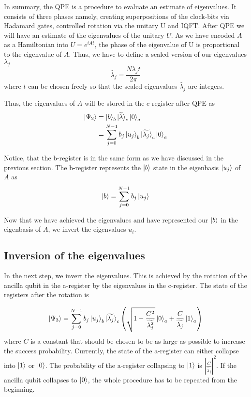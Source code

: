 In summary, the QPE is a procedure to evaluate an estimate of eigenvalues. 
It consists of three phases namely, creating superpositions of the clock-bits via Hadamard gates, controlled rotation via the unitary U and IQFT.
After QPE we will have an estimate of the eigenvalues of the unitary $U$. 
As we have encoded $A$ as a Hamiltonian into $U = e^{iAt}$, the phase of the eigenvalue of U is proportional to the eigenvalue of $A$.
Thus, we have to define a scaled version of our eigenvalues $\lambda_j$
\begin{equation}
\widetilde{\lambda_j} = \frac {N\lambda_jt}{2\pi}
\end{equation}
where $t$ can be chosen freely so that the scaled eigenvalues $\widetilde{\lambda_j}$ are integers.

Thus, the eigenvalues of $A$ will be stored in the c-register after QPE as
\begin{equation}
\begin{split}
\ket{\Psi_2} &= \ket{b}_b \ket{\widetilde{\lambda}}_c\ket{0}_a \\
& =\sum_{j=0}^{N-1} b_j \ket{u_j}_b \ket{\widetilde{\lambda_j}}_c \ket 0_a
\end{split}
\end{equation}

Notice, that the b-register is in the same form as we have discussed in the previous section. 
The b-register represents the $\ket b$ state in the eigenbasis $\ket{u_j}$ of $A$ as
\begin{equation}
\ket{b} = \sum_{j=0}^{N-1} b_j\ket{u_j}
\end{equation}

Now that we have achieved the eigenvalues and have represented our $\ket{b}$ in the eigenbasis of $A$, we invert the eigenvalues $u_i$.


\subsection{Inversion of the eigenvalues}
In the next step, we invert the eigenvalues.
This is achieved by the rotation of the ancilla qubit in the a-register by the eigenvalues in the c-register.
The state of the registers after the rotation is

\begin{equation}
\ket{\Psi_3} = \sum_{j=0}^{N-1} b_j \ket{u_j}_b {\ket{\widetilde{\lambda_j}}}_c \left(\sqrt{1-\frac{C^2}{\widetilde{\lambda_j^2}}}\ket{0}_a + \frac{C}{\widetilde{\lambda_j}} \ket{1}_a\right)
\end{equation}
where $C$ is a constant that should be chosen to be as large as possible to increase the success probability.
Currently, the state of the a-register can either collapse into $\ket 1$ or $\ket 0$. 
The probability of the a-register collapsing to $\ket 1$ is $\left|\frac C {\widetilde{\lambda_j}}\right|^2$.
If the ancilla qubit collapses to $\ket 0$, the whole procedure has to be repeated from the beginning. 

